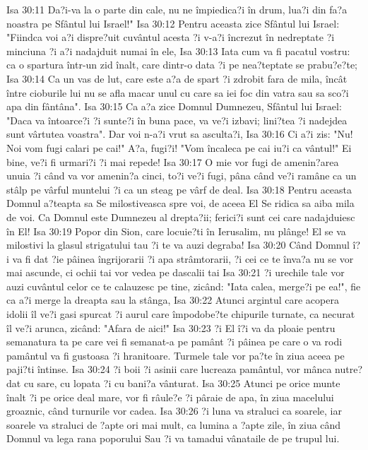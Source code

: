 Isa 30:11  Da?i-va la o parte din cale, nu ne împiedica?i în drum, lua?i din fa?a noastra pe Sfântul lui Israel!"
Isa 30:12  Pentru aceasta zice Sfântul lui Israel: "Fiindca voi a?i dispre?uit cuvântul acesta ?i v-a?i încrezut în nedreptate ?i minciuna ?i a?i nadajduit numai în ele,
Isa 30:13  Iata cum va fi pacatul vostru: ca o spartura într-un zid înalt, care dintr-o data ?i pe nea?teptate se prabu?e?te;
Isa 30:14  Ca un vas de lut, care este a?a de spart ?i zdrobit fara de mila, încât între cioburile lui nu se afla macar unul cu care sa iei foc din vatra sau sa sco?i apa din fântâna".
Isa 30:15  Ca a?a zice Domnul Dumnezeu, Sfântul lui Israel: "Daca va întoarce?i ?i sunte?i în buna pace, va ve?i izbavi; lini?tea ?i nadejdea sunt vârtutea voastra". Dar voi n-a?i vrut sa asculta?i,
Isa 30:16  Ci a?i zis: "Nu! Noi vom fugi calari pe cai!" A?a, fugi?i! "Vom încaleca pe cai iu?i ca vântul!" Ei bine, ve?i fi urmari?i ?i mai repede!
Isa 30:17  O mie vor fugi de amenin?area unuia ?i când va vor amenin?a cinci, to?i ve?i fugi, pâna când ve?i ramâne ca un stâlp pe vârful muntelui ?i ca un steag pe vârf de deal.
Isa 30:18  Pentru aceasta Domnul a?teapta sa Se milostiveasca spre voi, de aceea El Se ridica sa aiba mila de voi. Ca Domnul este Dumnezeu al drepta?ii; ferici?i sunt cei care nadajduiesc în El!
Isa 30:19  Popor din Sion, care locuie?ti în Ierusalim, nu plânge! El se va milostivi la glasul strigatului tau ?i te va auzi degraba!
Isa 30:20  Când Domnul î?i va fi dat ?ie pâinea îngrijorarii ?i apa strâmtorarii, ?i cei ce te înva?a nu se vor mai ascunde, ci ochii tai vor vedea pe dascalii tai
Isa 30:21  ?i urechile tale vor auzi cuvântul celor ce te calauzesc pe tine, zicând: "Iata calea, merge?i pe ea!", fie ca a?i merge la dreapta sau la stânga,
Isa 30:22  Atunci argintul care acopera idolii îl ve?i gasi spurcat ?i aurul care împodobe?te chipurile turnate, ca necurat îl ve?i arunca, zicând: "Afara de aici!"
Isa 30:23  ?i El î?i va da ploaie pentru semanatura ta pe care vei fi semanat-a pe pamânt ?i pâinea pe care o va rodi pamântul va fi gustoasa ?i hranitoare. Turmele tale vor pa?te în ziua aceea pe paji?ti întinse.
Isa 30:24  ?i boii ?i asinii care lucreaza pamântul, vor mânca nutre? dat cu sare, cu lopata ?i cu bani?a vânturat.
Isa 30:25  Atunci pe orice munte înalt ?i pe orice deal mare, vor fi râule?e ?i pâraie de apa, în ziua macelului groaznic, când turnurile vor cadea.
Isa 30:26  ?i luna va straluci ca soarele, iar soarele va straluci de ?apte ori mai mult, ca lumina a ?apte zile, în ziua când Domnul va lega rana poporului Sau ?i va tamadui vânataile de pe trupul lui.
